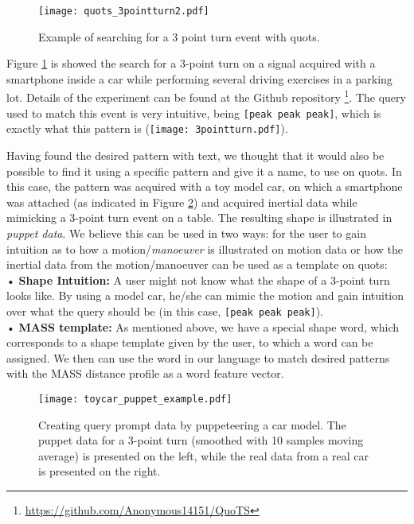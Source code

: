 \begin{figure}
\texttt{[image: quots\_3pointturn2.pdf]}
\caption{Example of searching for a 3 point turn event with \gls{quots}.}
\label{fig:quots_3pointturn}
\end{figure}

Figure \ref{fig:quots_3pointturn} is showed the search for a 3-point turn on a signal acquired with a smartphone inside a car while performing several driving exercises in a parking lot. Details of the experiment can be found at the Github repository \footnote{\url{https://github.com/Anonymous14151/QuoTS}}. The query used to match this event is very intuitive, being \texttt{[peak peak peak]}, which is exactly what this pattern is (\texttt{[image: 3pointturn.pdf]}). 
\par
Having found the desired pattern with text, we thought that it would also be possible to find it using a specific pattern and give it a name, to use on \gls{quots}. In this case, the pattern was acquired with a toy model car, on which a smartphone was attached (as indicated in Figure \ref{fig:puppeteering}) and acquired inertial data while mimicking a 3-point turn event on a table. The resulting shape is illustrated in \textit{puppet data}. We believe this can be used in two ways: for the user to gain intuition as to how a motion/\textit{manoeuver} is illustrated on motion data or how the inertial data from the motion/manoeuver can be used as a template on \gls{quots}: \\
•	\textbf{Shape Intuition:} A user might not know what the shape of a 3-point turn looks like. By using a model car, he/she can mimic the motion and gain intuition over what the query should be (in this case, \texttt{[peak peak peak]}). \\
•	\textbf{MASS template:} As mentioned above, we have a special shape word, which corresponds to a shape template given by the user, to which a word can be assigned. We then can use the word in our language to match desired patterns with the MASS distance profile as a word feature vector.  

\begin{figure}[h]
    \centering
    \texttt{[image: toycar\_puppet\_example.pdf]}
    \caption{Creating query prompt data by puppeteering a car model. The puppet data for a 3-point turn (smoothed with 10 samples moving average) is presented on the left, while the real data from a real car is presented on the right. }
    \label{fig:puppeteering}
\end{figure}

